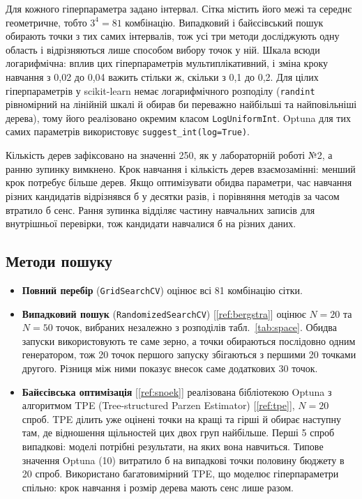 \documentclass[14pt,a4paper]{extreport}
\begin{document}
Для кожного гіперпараметра задано інтервал. Сітка містить його межі та середнє геометричне, тобто $3^4 = 81$ комбінацію. Випадковий і байєсівський пошук обирають точки з тих самих інтервалів, тож усі три методи досліджують одну область і відрізняються лише способом вибору точок у ній. Шкала всюди логарифмічна: вплив цих гіперпараметрів мультиплікативний, і зміна кроку навчання з 0,02 до 0,04 важить стільки ж, скільки з 0,1 до 0,2. Для цілих гіперпараметрів у scikit-learn немає логарифмічного розподілу (\texttt{randint} рівномірний на лінійній шкалі й обирав би переважно найбільші та найповільніші дерева), тому його реалізовано окремим класом \texttt{LogUniformInt}. Optuna для тих самих параметрів використовує \texttt{suggest\_int(log=True)}.

Кількість дерев зафіксовано на значенні 250, як у лабораторній роботі №2, а ранню зупинку вимкнено. Крок навчання і кількість дерев взаємозамінні: менший крок потребує більше дерев. Якщо оптимізувати обидва параметри, час навчання різних кандидатів відрізнявся б у десятки разів, і порівняння методів за часом втратило б сенс. Рання зупинка відділяє частину навчальних записів для внутрішньої перевірки, тож кандидати навчалися б на різних даних.

\subsection{Методи пошуку}

\begin{itemize}
\item \textbf{Повний перебір} (\texttt{GridSearchCV}) оцінює всі 81 комбінацію сітки.
\item \textbf{Випадковий пошук} (\texttt{RandomizedSearchCV}) [\ref{ref:bergstra}] оцінює $N = 20$ та $N = 50$ точок, вибраних незалежно з розподілів табл.~\ref{tab:space}. Обидва запуски використовують те саме зерно, а точки обираються послідовно одним генератором, тож 20 точок першого запуску збігаються з першими 20 точками другого. Різниця між ними показує внесок саме додаткових 30 точок.
\item \textbf{Байєсівська оптимізація} [\ref{ref:snoek}] реалізована бібліотекою Optuna з алгоритмом TPE (Tree-structured Parzen Estimator) [\ref{ref:tpe}], $N = 20$ спроб. TPE ділить уже оцінені точки на кращі та гірші й обирає наступну там, де відношення щільностей цих двох груп найбільше. Перші 5 спроб випадкові: моделі потрібні результати, на яких вона навчиться. Типове значення Optuna (10) витратило б на випадкові точки половину бюджету в 20 спроб. Використано багатовимірний TPE, що моделює гіперпараметри спільно: крок навчання і розмір дерева мають сенс лише разом.
\end{itemize}
\end{document}
